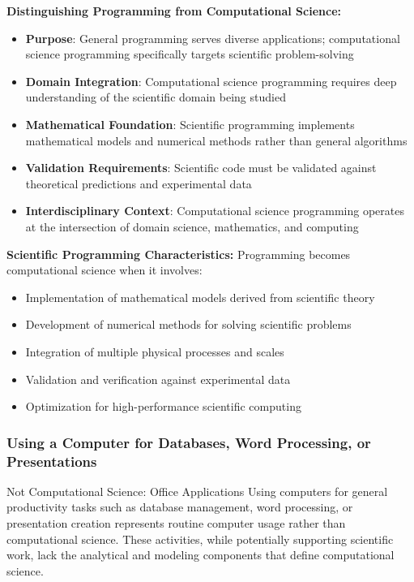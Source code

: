 \textbf{Distinguishing Programming from Computational Science:}
\begin{itemize}
    \item \textbf{Purpose}: General programming serves diverse applications; computational science programming specifically targets scientific problem-solving
    \item \textbf{Domain Integration}: Computational science programming requires deep understanding of the scientific domain being studied
    \item \textbf{Mathematical Foundation}: Scientific programming implements mathematical models and numerical methods rather than general algorithms
    \item \textbf{Validation Requirements}: Scientific code must be validated against theoretical predictions and experimental data
    \item \textbf{Interdisciplinary Context}: Computational science programming operates at the intersection of domain science, mathematics, and computing
\end{itemize}

\textbf{Scientific Programming Characteristics:}
Programming becomes computational science when it involves:
\begin{itemize}
    \item Implementation of mathematical models derived from scientific theory
    \item Development of numerical methods for solving scientific problems
    \item Integration of multiple physical processes and scales
    \item Validation and verification against experimental data
    \item Optimization for high-performance scientific computing
\end{itemize}

\subsubsection{Using a Computer for Databases, Word Processing, or Presentations}

\begin{conceptcard}{Not Computational Science: Office Applications}
Using computers for general productivity tasks such as database management, word processing, or presentation creation represents routine computer usage rather than computational science. These activities, while potentially supporting scientific work, lack the analytical and modeling components that define computational science.
\end{conceptcard}

